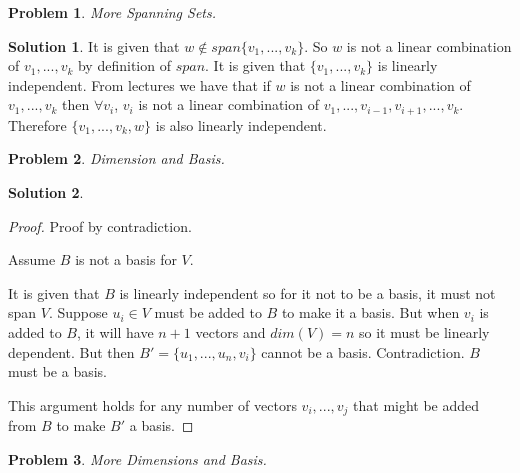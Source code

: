 \documentclass{article}
\newtheorem{problem}{Problem}
\theoremstyle{definition}
\newtheorem*{solution}{Solution}
\begin{document}
\begin{problem}

More Spanning Sets.

\end{problem}

\begin{solution}

It is given that $w\notin span\{v_1,...,v_k\}$.
So $w$ is not a linear combination of $v_1,...,v_k$ by definition of $span$.
It is given that $\{v_1,...,v_k\}$ is linearly independent.
From lectures we have that if $w$ is not a linear combination of $v_1,...,v_k$ then $\forall v_i$, $v_i$ is not a linear combination of $v_1,...,v_{i-1},v_{i+1},...,v_k$.
Therefore $\{v_1,...,v_k,w\}$ is also linearly independent.

\end{solution}

\begin{problem}

Dimension and Basis.

\end{problem}

\begin{solution}

\begin{proof}
Proof by contradiction.

Assume $B$ is not a basis for $V$.

It is given that $B$ is linearly independent so for it not to be a basis, it must not span $V$.
Suppose $u_i\in V$ must be added to $B$ to make it a basis.
But when $v_i$ is added to $B$, it will have $n+1$ vectors and $dim(V)=n$ so it must be linearly dependent.
But then $B'=\{u_1,...,u_n,v_i\}$ cannot be a basis.
Contradiction.
$B$ must be a basis.

This argument holds for any number of vectors $v_i,...,v_j$ that might be added from $B$ to make $B'$ a basis.
\end{proof}

\end{solution}

\begin{problem}

More Dimensions and Basis.

\end{problem}
\end{document}
